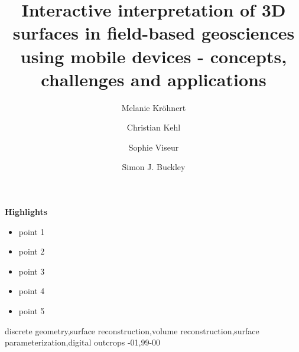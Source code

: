 \documentclass[review]{elsarticle}
\begin{document}
\setlength\emergencystretch{1.5em}

\begin{frontmatter}

\title{Interactive interpretation of 3D surfaces in field-based geosciences using mobile devices - concepts, challenges and applications}



\author[tudresden]{Melanie Kr\"{o}hnert}

\author[cerege,dtu]{Christian Kehl}


\author[cerege]{Sophie Viseur}

\author[uniresearch,uib]{Simon J. Buckley}

\address[tudresden]{Institute for Photogrammetry \& Remote Sensing, TU Dresden, Helmholtzstr. 10, 01069 Dresden, Germany}
\address[cerege]{Aix Marseille Universit\'{e}, CNRS, IRD, CEREGE UM 34, Dept. Sedimentary and Reservoir Systems, 13001 Marseille, France}
\address[uniresearch]{Uni Research AS -- CIPR, Nyg{\aa}rdsgaten 112, 5008 Bergen, Norway}
\address[uib]{Department of Earth Science, University of Bergen, All\'{e}gaten 41, 5007 Bergen, Norway}
\address[dtu]{}


\begin{abstract}

\end{abstract}

\textbf{Highlights} \\
\begin{itemize}
\item point 1
\item point 2
\item point 3
\item point 4
\item point 5
\end{itemize}

\begin{keyword}
discrete geometry\sep surface reconstruction\sep volume reconstruction\sep surface parameterization\sep digital outcrops
-01\sep  99-00
\end{keyword}

\end{frontmatter}
\end{document}
